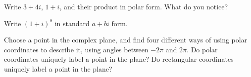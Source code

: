 \documentclass[space,nooutcomes]{ximera}
\begin{document}
\newpage 

\begin{problem}
Write $3 + 4i$, $1 + i$, and their product in polar form.  What do you notice?  
\vfill 
\end{problem}

\begin{problem}
Write $(1 + i)^8$ in standard $a + bi$ form.  
\vfill 
\end{problem}

\begin{problem}
Choose a point in the complex plane, and find four different ways of using polar coordinates to describe it, using angles between $-2\pi$ and $2\pi$.  
Do polar coordinates uniquely label a point in the plane?
Do rectangular coordinates uniquely label a point in the plane?
\vfill 
\end{problem}
\end{document}
